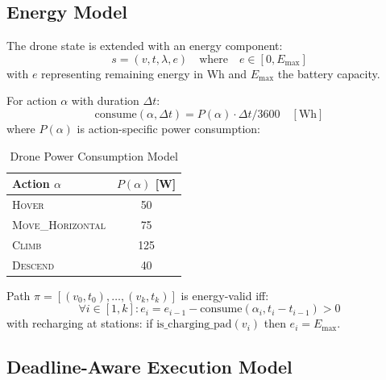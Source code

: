 \subsection{Energy Model}

\begin{definition}
The drone state is extended with an energy component:
\begin{equation}
s = (v, t, \lambda, e) \quad \text{where} \quad e \in [0, E_{\max}]
\end{equation}
with $e$ representing remaining energy in Wh and $E_{\max}$ the battery capacity.
\end{definition}

\begin{definition}
For action $\alpha$ with duration $\Delta t$:
\begin{equation}
\text{consume}(\alpha, \Delta t) = P(\alpha) \cdot \Delta t / 3600 \quad [\text{Wh}]
\end{equation}
where $P(\alpha)$ is action-specific power consumption:
\end{definition}

\begin{table}[htbp]
\centering
\caption{Drone Power Consumption Model}
\label{tab:power}
\begin{tabular}{@{}lc@{}}
\toprule
Action $\alpha$ & $P(\alpha)$ [W] \\
\midrule
\textsc{Hover} & 50 \\
\textsc{Move\_Horizontal} & 75 \\
\textsc{Climb} & 125 \\
\textsc{Descend} & 40 \\
\bottomrule
\end{tabular}
\end{table}

\begin{definition}
Path $\pi = [(v_0, t_0), \ldots, (v_k, t_k)]$ is energy-valid iff:
\begin{equation}
\forall i \in [1, k]: e_i = e_{i-1} - \text{consume}(\alpha_i, t_i - t_{i-1}) > 0
\end{equation}
with recharging at stations: if $\text{is\_charging\_pad}(v_i)$ then $e_i = E_{\max}$.
\end{definition}

\subsection{Deadline-Aware Execution Model}

